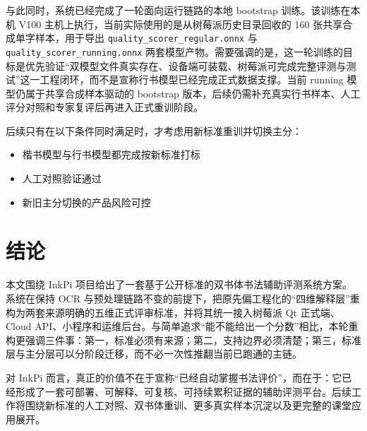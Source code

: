 \documentclass[UTF8,a4paper,12pt,fontset=none]{ctexart}
\begin{document}
与此同时，系统已经完成了一轮面向运行链路的本地 bootstrap 训练。该训练在本机 V100 主机上执行，当前实际使用的是从树莓派历史目录回收的 160 张共享合成单字样本，用于导出 \texttt{quality\_scorer\_regular.onnx} 与 \texttt{quality\_scorer\_running.onnx} 两套模型产物。需要强调的是，这一轮训练的目标是优先验证“双模型文件真实存在、设备端可装载、树莓派可完成完整评测与测试”这一工程闭环，而不是宣称行书模型已经完成正式数据支撑。当前 running 模型仍属于共享合成样本驱动的 bootstrap 版本，后续仍需补充真实行书样本、人工评分对照和专家复评后再进入正式重训阶段。

后续只有在以下条件同时满足时，才考虑用新标准重训并切换主分：

\begin{itemize}
  \item 楷书模型与行书模型都完成按新标准打标
  \item 人工对照验证通过
  \item 新旧主分切换的产品风险可控
\end{itemize}

\section{结论}
本文围绕 InkPi 项目给出了一套基于公开标准的双书体书法辅助评测系统方案。系统在保持 OCR 与预处理链路不变的前提下，把原先偏工程化的“四维解释层”重构为两套来源明确的五维正式评审标准，并将其统一接入树莓派 Qt 正式端、Cloud API、小程序和运维后台。与简单追求“能不能给出一个分数”相比，本轮重构更强调三件事：第一，标准必须有来源；第二，支持边界必须清楚；第三，标准层与主分层可以分阶段迁移，而不必一次性推翻当前已跑通的主链。

对 InkPi 而言，真正的价值不在于宣称“已经自动掌握书法评价”，而在于：它已经形成了一套可部署、可解释、可复核、可持续累积证据的辅助评测平台。后续工作将围绕新标准的人工对照、双书体重训、更多真实样本沉淀以及更完整的课堂应用展开。
\end{document}
